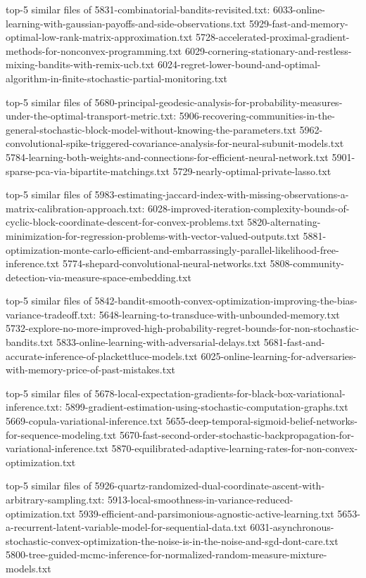 \documentclass[11pt]{article}
\begin{document}
top-5 similar files of 5831-combinatorial-bandits-revisited.txt:
6033-online-learning-with-gaussian-payoffs-and-side-observations.txt
5929-fast-and-memory-optimal-low-rank-matrix-approximation.txt
5728-accelerated-proximal-gradient-methods-for-nonconvex-programming.txt
6029-cornering-stationary-and-restless-mixing-bandits-with-remix-ucb.txt
6024-regret-lower-bound-and-optimal-algorithm-in-finite-stochastic-partial-monitoring.txt

top-5 similar files of
5680-principal-geodesic-analysis-for-probability-measures-under-the-optimal-transport-metric.txt:
5906-recovering-communities-in-the-general-stochastic-block-model-without-knowing-the-parameters.txt
5962-convolutional-spike-triggered-covariance-analysis-for-neural-subunit-models.txt
5784-learning-both-weights-and-connections-for-efficient-neural-network.txt
5901-sparse-pca-via-bipartite-matchings.txt
5729-nearly-optimal-private-lasso.txt

top-5 similar files of
5983-estimating-jaccard-index-with-missing-observations-a-matrix-calibration-approach.txt:
6028-improved-iteration-complexity-bounds-of-cyclic-block-coordinate-descent-for-convex-problems.txt
5820-alternating-minimization-for-regression-problems-with-vector-valued-outputs.txt
5881-optimization-monte-carlo-efficient-and-embarrassingly-parallel-likelihood-free-inference.txt
5774-shepard-convolutional-neural-networks.txt
5808-community-detection-via-measure-space-embedding.txt

top-5 similar files of
5842-bandit-smooth-convex-optimization-improving-the-bias-variance-tradeoff.txt:
5648-learning-to-transduce-with-unbounded-memory.txt
5732-explore-no-more-improved-high-probability-regret-bounds-for-non-stochastic-bandits.txt
5833-online-learning-with-adversarial-delays.txt
5681-fast-and-accurate-inference-of-plackettluce-models.txt
6025-online-learning-for-adversaries-with-memory-price-of-past-mistakes.txt

top-5 similar files of
5678-local-expectation-gradients-for-black-box-variational-inference.txt:
5899-gradient-estimation-using-stochastic-computation-graphs.txt
5669-copula-variational-inference.txt
5655-deep-temporal-sigmoid-belief-networks-for-sequence-modeling.txt
5670-fast-second-order-stochastic-backpropagation-for-variational-inference.txt
5870-equilibrated-adaptive-learning-rates-for-non-convex-optimization.txt

top-5 similar files of
5926-quartz-randomized-dual-coordinate-ascent-with-arbitrary-sampling.txt:
5913-local-smoothness-in-variance-reduced-optimization.txt
5939-efficient-and-parsimonious-agnostic-active-learning.txt
5653-a-recurrent-latent-variable-model-for-sequential-data.txt
6031-asynchronous-stochastic-convex-optimization-the-noise-is-in-the-noise-and-sgd-dont-care.txt
5800-tree-guided-mcmc-inference-for-normalized-random-measure-mixture-models.txt
\end{document}
